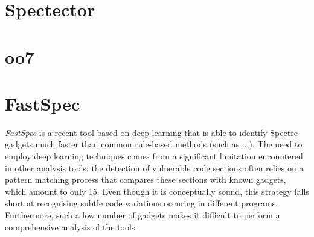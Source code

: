 \documentclass[12pt,a4paper]{book}
\theoremstyle{definition}
\begin{document}
	\begin{comment}
	\section{Jasmin}
	\textit{Jasmin} \cite{Almeida2017} is a language that allows writing cryptographic software that is not only efficient and functionally correct but also easy to formally verify. In general, cryptographic code is usually written in Assembly or some similar low-level languages (e.g. \textsf{qhasm}), to satisfy efficiency requirements. However, formal verification of such programs is extremely challenging due to complex side effects, unstructured control flow, and flat structure. Side-effects are unpredicted and often undesired events that happen as a consequence of certain operations. While high-level languages can rely on sophisticated methods to avoid them, languages like Assembly are often more prone to have them. Moreover, low-level languages usually don't provide explicit control flow structures such as if then else or loops. These are precisely the type of high-level structures that may introduce side-channel vulnerabilities, thus their absence can make it difficult to detect such threats. 
	
	To get around these issues, Jasmin maintains a low-level fashion but allows the usage of some high-level features, including function calls and structured control flow. This makes it easier to detect Spectre gadgets, without affecting the performance. Besides verifiability, Jasmin code is also predictable: while the programmer can use machine instructions from different micro-architectures, they can precisely anticipate what the assembly code will look like. Jasmin code is then compiled to Assembly in such a way that the functional and safety properties are maintained unaltered. 
	\end{comment}
	\section{Spectector}
	
	\section{oo7}
	
	\section{FastSpec}
	\textit{FastSpec} \cite{Tol2021} is a recent tool based on deep learning that is able to identify Spectre gadgets much faster than common rule-based methods (such as ...). The need to employ deep learning techniques comes from a significant limitation encountered in other analysis tools: the detection of vulnerable code sections often relies on a pattern matching process that compares these sections with known gadgets, which amount to only 15. Even though it is conceptually sound, this strategy falls short at recognising subtle code variations occuring in different programs. Furthermore, such a low number of gadgets makes it difficult to perform a comprehensive analysis of the tools.
	
\end{document}
